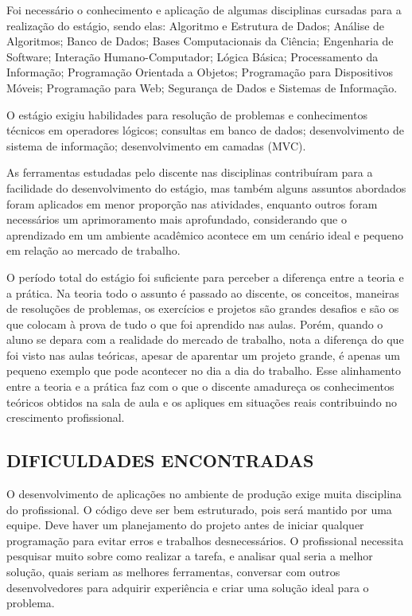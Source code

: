 \documentclass[
  12pt,				%
  openany,
  oneside,
  a4paper,			%
  english,			%
  brazil
]{article}
\numberwithin{figure}{section}
\numberwithin{table}{section}
\begin{document}
Foi necessário o conhecimento e aplicação de algumas disciplinas cursadas para a realização do estágio, sendo elas: Algoritmo e Estrutura de Dados; Análise de Algoritmos; Banco de Dados; Bases Computacionais da Ciência; Engenharia de Software; Interação Humano-Computador; Lógica Básica; Processamento da Informação; Programação Orientada a Objetos; Programação para Dispositivos Móveis; Programação para Web; Segurança de Dados e Sistemas de Informação.

O estágio exigiu habilidades para resolução de problemas e conhecimentos técnicos em operadores lógicos; consultas em banco de dados; desenvolvimento de sistema de informação; desenvolvimento em camadas (MVC).

As ferramentas estudadas pelo discente nas disciplinas contribuíram para a facilidade do desenvolvimento do estágio, mas também alguns assuntos abordados foram aplicados em menor proporção nas atividades, enquanto outros foram necessários um aprimoramento mais aprofundado, considerando que o aprendizado em um ambiente acadêmico acontece em um cenário ideal e pequeno em relação ao mercado de trabalho.

O período total do estágio foi suficiente para perceber a diferença entre a teoria e a prática. Na teoria todo o assunto é passado ao discente, os conceitos, maneiras de resoluções de problemas, os exercícios e projetos são grandes desafios e são os que colocam à prova de tudo o que foi aprendido nas aulas. Porém, quando o aluno se depara com a realidade do mercado de trabalho, nota a diferença do que foi visto nas aulas teóricas, apesar de aparentar um projeto grande, é apenas um pequeno exemplo que pode acontecer no dia a dia do trabalho. Esse alinhamento entre a teoria e a prática faz com o que o discente amadureça os conhecimentos teóricos obtidos na sala de aula e os apliques em situações reais contribuindo no crescimento profissional.



\subsection{DIFICULDADES ENCONTRADAS}

O desenvolvimento de aplicações no ambiente de produção exige muita disciplina do profissional. O código deve ser bem estruturado, pois será mantido por uma equipe. Deve haver um planejamento do projeto antes de iniciar qualquer programação para evitar erros e trabalhos desnecessários. O profissional necessita pesquisar muito sobre como realizar a tarefa, e analisar qual seria a melhor solução, quais seriam as melhores ferramentas, conversar com outros desenvolvedores para adquirir experiência e criar uma solução ideal para o problema.
\end{document}
